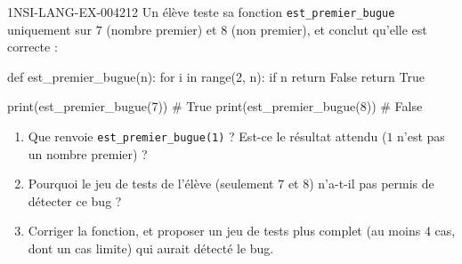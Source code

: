 \begin{exercice}{1NSI-LANG-EX-004}{2}{12}
Un élève teste sa fonction \lstinline{est_premier_bugue} uniquement sur $7$ (nombre
premier) et $8$ (non premier), et conclut qu'elle est correcte :
\begin{python}
def est_premier_bugue(n):
    for i in range(2, n):
        if n %
            return False
    return True

print(est_premier_bugue(7))  # True
print(est_premier_bugue(8))  # False
\end{python}
\begin{enumerate}
  \item Que renvoie \lstinline{est_premier_bugue(1)} ? Est-ce le résultat attendu ($1$ n'est pas un nombre premier) ?
  \item Pourquoi le jeu de tests de l'élève (seulement $7$ et $8$) n'a-t-il pas permis de détecter ce bug ?
  \item Corriger la fonction, et proposer un jeu de tests plus complet (au moins $4$ cas, dont un cas limite) qui aurait détecté le bug.
\end{enumerate}
\end{exercice}
